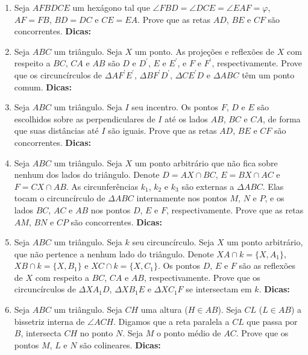 \documentclass{article}
\newcommand{\dica}{\textbf{Dicas:}}
\newcommand{\iniTri}{Seja $ABC$ um triângulo}
\begin{document}
\begin{multicols}{2}
\begin{enumerate}
    \item Seja $AFBDCE$ um hexágono tal que $\angle FBD=\angle DCE=\angle EAF=\varphi$, $AF=FB$, $BD=DC$ e $CE=EA$. Prove que as retas $AD$, $BE$ e $CF$ são concorrentes. \dica %
    
    \item \iniTri. Seja $X$ um ponto. As projeções e reflexões de $X$ com respeito a $BC$, $CA$ e $AB$ são $D$ e $D^{\prime}$, $E$ e $E^{\prime}$, e $F$ e $F^{\prime}$, respectivamente. Prove que os circuncírculos de $\Delta AF^{\prime}E^{\prime}$, $\Delta BF^{\prime}D^{\prime}$, $\Delta CE^{\prime}D$ e $\Delta ABC$ têm um ponto comum. \dica %
    
    \item \iniTri. Seja $I$ seu incentro. Os pontos $F$, $D$ e $E$ são escolhidos sobre as perpendiculares de $I$ até os lados $AB$, $BC$ e $CA$, de forma que suas distâncias até $I$ são iguais. Prove que as retas $AD$, $BE$ e $CF$ são concorrentes. \dica %
    
    \item \iniTri. Seja $X$ um ponto arbitrário que não fica sobre nenhum dos lados do triângulo. Denote $D=AX\cap BC$, $E=BX\cap AC$ e $F=CX\cap AB$. As circunferências $k_1$, $k_2$ e $k_3$ são externas a $\Delta ABC$. Elas tocam o circuncírculo de $\Delta ABC$ internamente nos pontos $M$, $N$ e $P$, e os lados $BC$, $AC$ e $AB$ nos pontos $D$, $E$ e $F$, respectivamente. Prove que as retas $AM$, $BN$ e $CP$ são concorrentes. \dica %
    
    \item \iniTri. Seja $k$ seu circuncírculo. Seja $X$ um ponto arbitrário, que não pertence a nenhum lado do triângulo. Denote $XA\cap k=\{X,A_1\}$, $XB\cap k=\{X,B_1\}$ e $XC\cap k=\{X,C_1\}$. Os pontos $D$, $E$ e $F$ são as reflexões de $X$ com respeito a $BC$, $CA$ e $AB$, respectivamente. Prove que os circuncírculos de $\Delta XA_1D$, $\Delta XB_1E$ e $\Delta XC_1F$ se intersectam em $k$. \dica %
    
    \item \iniTri. Seja $CH$ uma altura ($H\in AB$). Seja $CL$ ($L\in AB$) a bissetriz interna de $\angle ACH$. Digamos que a reta paralela a $CL$ que passa por $B$, intersecta $CH$ no ponto $N$. Seja $M$ o ponto médio de $AC$. Prove que os pontos $M$, $L$ e $N$ são colineares. \dica %
    

\end{enumerate}
\end{multicols}
\end{document}

